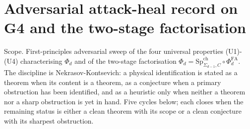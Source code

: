 \providecommand{\ClaimStatusTheorem}{\textsc{[Theorem]}}
\providecommand{\ClaimStatusConjectured}{\textsc{[Conjectured]}}
\providecommand{\ClaimStatusHeuristic}{\textsc{[Heuristic]}}
\providecommand{\ClaimStatusRetracted}{\textsc{[Retracted]}}
\providecommand{\ClaimStatusDefinition}{\textsc{[Definition]}}
\providecommand{\ClaimStatusScoped}{\textsc{[Scoped]}}
\providecommand{\ClaimStatusProvedHere}{\textsc{[Proved here]}}
\providecommand{\ClaimStatusProvedElsewhere}{\textsc{[Proved elsewhere]}}
\providecommand{\ZZ}{\mathbb{Z}}
\providecommand{\QQ}{\mathbb{Q}}
\providecommand{\CC}{\mathbb{C}}
\providecommand{\NN}{\mathbb{N}}
\providecommand{\RR}{\mathbb{R}}
\providecommand{\fg}{\mathfrak{g}}
\providecommand{\fgl}{\mathfrak{gl}}
\providecommand{\cC}{\mathcal{C}}
\providecommand{\cE}{\mathcal{E}}
\providecommand{\cH}{\mathcal{H}}
\providecommand{\cM}{\mathcal{M}}
\providecommand{\cO}{\mathcal{O}}
\providecommand{\cW}{\mathcal{W}}
\providecommand{\cZ}{\mathcal{Z}}
\providecommand{\Hoch}{\mathrm{HH}}
\providecommand{\CC}{\mathbb{C}}
\providecommand{\Bord}{B^{\mathrm{ord}}}
\providecommand{\Coh}{\mathrm{Coh}}
\providecommand{\CoHA}{\mathrm{CoHA}}
\providecommand{\Rep}{\mathrm{Rep}}
\providecommand{\Sym}{\mathrm{Sym}}
\providecommand{\CYcat}{\CY\text{-}\Cat}
\providecommand{\CY}{\mathrm{CY}}
\providecommand{\Cat}{\mathrm{Cat}}
\providecommand{\ChirAlg}{\mathrm{ChirAlg}}
\providecommand{\ChirCoAlg}{\mathrm{ChirCoAlg}}
\providecommand{\PhiFA}{\Phi^{\mathrm{FA}}}
\providecommand{\HolFA}{\mathrm{HolFA}}
\providecommand{\EdHolFA}{E_d\text{-}\HolFA}
\providecommand{\EnHolFA}{E_n\text{-}\HolFA}
\providecommand{\SpCh}{\mathrm{Sp}^{\mathrm{ch}}}
\providecommand{\Sh}{\mathrm{Sh}}
\providecommand{\Fact}{\mathrm{Fact}}
\providecommand{\FactHom}{\mathrm{FH}}
\providecommand{\Einf}{E_\infty}
\providecommand{\Etwo}{E_2}
\providecommand{\Eone}{E_1}
\providecommand{\Ed}{E_d}
\providecommand{\hCS}{\mathrm{hCS}}
\providecommand{\CE}{\mathrm{CE}}
\providecommand{\Obs}{\mathrm{Obs}}
\providecommand{\BV}{\mathrm{BV}}
\providecommand{\BKM}{\mathrm{BKM}}
\providecommand{\Mon}{\mathbb{M}}
\providecommand{\Muk}{\mathrm{Muk}}
\providecommand{\tr}{\mathrm{tr}}
\providecommand{\Aut}{\mathrm{Aut}}
\providecommand{\str}{\mathrm{str}}

\section{Adversarial attack-heal record on G4 and the two-stage factorisation}
\label{wn:sec:wave17-agent-05}

Scope. First-principles adversarial sweep of the four universal
properties (U1)-(U4) characterising $\Phi_d$ and of the two-stage
factorisation $\Phi_d = \SpCh_{\Sigma_{d-1}, C} \circ \PhiFA_d$. The
discipline is Nekrasov-Kontsevich: a physical identification is stated
as a theorem when its content is a theorem, as a conjecture when a
primary obstruction has been identified, and as a heuristic only when
neither a theorem nor a sharp obstruction is yet in hand. Five cycles
below; each closes when the remaining status is either a clean theorem
with its scope or a clean conjecture with its sharpest obstruction.

